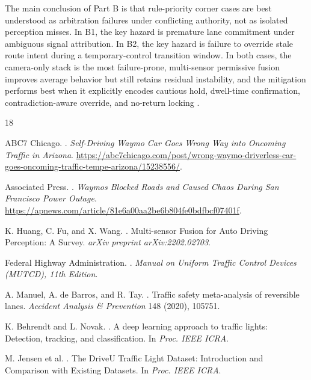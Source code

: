 \documentclass[sigconf,nonacm]{acmart}
\begin{document}
The main conclusion of Part B is that rule-priority corner cases are best understood as arbitration failures under conflicting authority, not as isolated perception misses. In B1, the key hazard is premature lane commitment under ambiguous signal attribution. In B2, the key hazard is failure to override stale route intent during a temporary-control transition window. In both cases, the camera-only stack is the most failure-prone, multi-sensor permissive fusion improves average behavior but still retains residual instability, and the mitigation performs best when it explicitly encodes cautious hold, dwell-time confirmation, contradiction-aware override, and no-return locking \cite{hirabayashi2019,monninger2023,veer2022,shalev2017}.

\begin{thebibliography}{18}

ABC7 Chicago.
.
\newblock \textit{Self-Driving Waymo Car Goes Wrong Way into Oncoming Traffic in Arizona}.
\newblock \url{https://abc7chicago.com/post/wrong-waymo-driverless-car-goes-oncoming-traffic-tempe-arizona/15238556/}.

Associated Press.
.
\newblock \textit{Waymos Blocked Roads and Caused Chaos During San Francisco Power Outage}.
\newblock \url{https://apnews.com/article/81e6a00aa2be6b804fe0bdfbcf07401f}.

K. Huang, C. Fu, and X. Wang.
.
\newblock Multi-sensor Fusion for Auto Driving Perception: A Survey.
\newblock \textit{arXiv preprint arXiv:2202.02703}.

Federal Highway Administration.
.
\newblock \textit{Manual on Uniform Traffic Control Devices (MUTCD), 11th Edition}.

A. Manuel, A. de Barros, and R. Tay.
.
\newblock Traffic safety meta-analysis of reversible lanes.
\newblock \textit{Accident Analysis \& Prevention} 148 (2020), 105751.

K. Behrendt and L. Novak.
.
\newblock A deep learning approach to traffic lights: Detection, tracking, and classification.
\newblock In \textit{Proc. IEEE ICRA}.

M. Jensen et al.
.
\newblock The DriveU Traffic Light Dataset: Introduction and Comparison with Existing Datasets.
\newblock In \textit{Proc. IEEE ICRA}.


\end{thebibliography}
\end{document}
